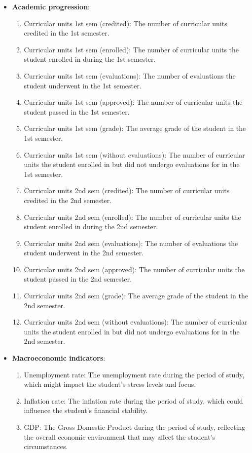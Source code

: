 \documentclass[12pt]{article}
\begin{document}
\begin{itemize}
    \item \textbf{Academic progression}:
          \begin{enumerate}
              \item Curricular units 1st sem (credited): The number of curricular units credited in the 1st semester.
              \item Curricular units 1st sem (enrolled): The number of curricular units the student enrolled in during the 1st semester.
              \item Curricular units 1st sem (evaluations): The number of evaluations the student underwent in the 1st semester.
              \item Curricular units 1st sem (approved): The number of curricular units the student passed in the 1st semester.
              \item Curricular units 1st sem (grade): The average grade of the student in the 1st semester.
              \item Curricular units 1st sem (without evaluations): The number of curricular units the student enrolled in but did not undergo evaluations for in the 1st semester.
              \item Curricular units 2nd sem (credited): The number of curricular units credited in the 2nd semester.
              \item Curricular units 2nd sem (enrolled): The number of curricular units the student enrolled in during the 2nd semester.
              \item Curricular units 2nd sem (evaluations): The number of evaluations the student underwent in the 2nd semester.
              \item Curricular units 2nd sem (approved): The number of curricular units the student passed in the 2nd semester.
              \item Curricular units 2nd sem (grade): The average grade of the student in the 2nd semester.
              \item Curricular units 2nd sem (without evaluations): The number of curricular units the student enrolled in but did not undergo evaluations for in the 2nd semester.
          \end{enumerate}

    \item \textbf{Macroeconomic indicators}:
          \begin{enumerate}
              \item Unemployment rate: The unemployment rate during the period of study, which might impact the student's stress levels and focus.
              \item Inflation rate: The inflation rate during the period of study, which could influence the student's financial stability.
              \item GDP: The Gross Domestic Product during the period of study, reflecting the overall economic environment that may affect the student's circumstances.
          \end{enumerate}
\end{itemize}
\end{document}
